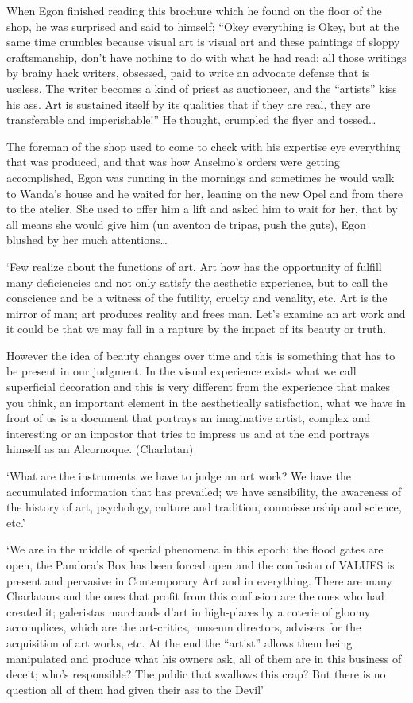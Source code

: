 \documentclass[smalldemyvopaper,11pt,twoside,onecolumn,openright,extrafontsizes]{memoir}
\begin{document}
\ornamentbreak

When Egon finished reading this brochure which he found on the floor of the shop, he was surprised and said to himself; “Okey everything is Okey, but at the same time crumbles because visual art is visual art and these paintings of sloppy craftsmanship, don’t have nothing to do with what he had read; all those writings by brainy hack writers, obsessed, paid to write an advocate defense that is useless. The writer becomes a kind of priest as auctioneer, and the “artists” kiss his ass. Art is sustained itself by its qualities that if they are real, they are transferable and imperishable!” He thought, crumpled the flyer and tossed…

\ornamentbreak

The foreman of the shop used to come to check with his expertise eye everything that was produced, and that was how Anselmo’s orders were getting accomplished, Egon was running in the mornings and sometimes he would walk to Wanda’s house and he waited for her, leaning on the new Opel and from there to the atelier. She used to offer him a lift and asked him to wait for her, that by all means she would give him (un aventon de tripas, push the guts), Egon blushed by her much attentions…

‘Few realize about the functions of art. Art how has the opportunity of fulfill many deficiencies and not only satisfy the aesthetic experience, but to call the conscience and be a witness of the futility, cruelty and venality, etc. Art is the mirror of man; art produces reality and frees man. Let’s examine an art work and it could be that we may fall in a rapture by the impact of its beauty or truth.

However the idea of beauty changes over time and this is something that has to be present in our judgment. In the visual experience exists what we call superficial decoration and this is very different from the experience that makes you think, an important element in the aesthetically satisfaction, what we have in front of us is a document that portrays an imaginative artist, complex and interesting or an impostor that tries to impress us and at the end portrays himself as an Alcornoque. (Charlatan)

‘What are the instruments we have to judge an art work? We have the accumulated information that has prevailed; we have sensibility, the awareness of the history of art, psychology, culture and tradition, connoisseurship and science, etc.’

‘We are in the middle of special phenomena in this epoch; the flood gates are open, the Pandora’s Box has been forced open and the confusion of VALUES is present and pervasive in Contemporary Art and in everything. There are many Charlatans and the ones that profit from this confusion are the ones who had created it; galeristas marchands d’art in high-places by a coterie of gloomy accomplices, which are the art-critics, museum directors, advisers for the acquisition of art works, etc. At the end the “artist” allows them being manipulated and produce what his owners ask, all of them are in this business of deceit; who’s responsible? The public that swallows this crap? But  there is no question all of them had given their ass to the Devil’ 
\end{document}
